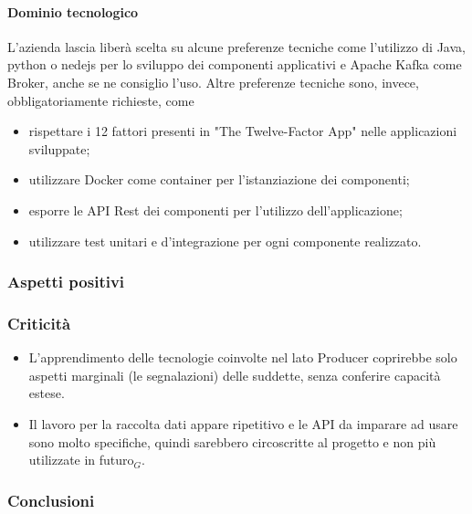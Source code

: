 \paragraph{Dominio tecnologico}
L'azienda lascia liberà scelta su alcune preferenze tecniche come l'utilizzo di
Java, python o nedejs per lo sviluppo dei componenti applicativi e Apache Kafka 
come Broker, anche se ne consiglio l'uso.
Altre preferenze tecniche sono, invece, obbligatoriamente richieste, come
\begin{itemize}
	\item rispettare i 12 fattori presenti in "The Twelve-Factor App" nelle 
	applicazioni sviluppate;
	\item utilizzare Docker come container per l'istanziazione dei componenti;
	\item esporre le API Rest dei componenti per l'utilizzo dell'applicazione; 
	\item utilizzare test unitari e d'integrazione per ogni componente 
	realizzato.

\end{itemize}
\subsubsection{Aspetti positivi}

\subsubsection{Criticità}
\begin{itemize}
	\item L'apprendimento delle tecnologie coinvolte nel lato 
	Producer coprirebbe solo aspetti marginali (le segnalazioni) delle
	suddette, senza conferire capacità estese. 
	\item Il lavoro per la raccolta dati appare ripetitivo e le
	 API da imparare ad usare sono molto specifiche, quindi sarebbero 
	 circoscritte al progetto e non più utilizzate in futuro$_{G}$. 
	 

\end{itemize}
\subsubsection{Conclusioni}